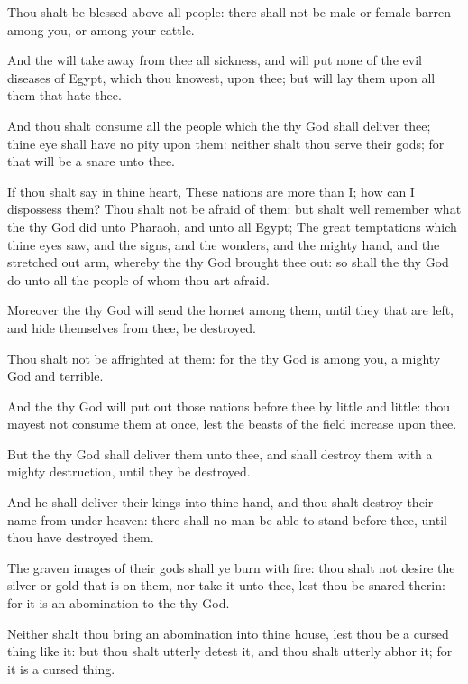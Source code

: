 \Verse Thou shalt be blessed above all people: there shall not be male or female barren among you, or among your cattle.

\Verse And the \LORD will take away from thee all sickness, and will put none of the evil diseases of Egypt, which thou knowest, upon thee; but will lay them upon all them that hate thee.

\Verse And thou shalt consume all the people which the \LORD thy God shall deliver thee; thine eye shall have no pity upon them: neither shalt thou serve their gods; for that will be a snare unto thee.

\Verse If thou shalt say in thine heart, These nations are more than I; how can I dispossess them?  \Verse Thou shalt not be afraid of them: but shalt well remember what the \LORD thy God did unto Pharaoh, and unto all Egypt; \Verse The great temptations which thine eyes saw, and the signs, and the wonders, and the mighty hand, and the stretched out arm, whereby the \LORD thy God brought thee out: so shall the \LORD thy God do unto all the people of whom thou art afraid.

\Verse Moreover the \LORD thy God will send the hornet among them, until they that are left, and hide themselves from thee, be destroyed.

\Verse Thou shalt not be affrighted at them: for the \LORD thy God is among you, a mighty God and terrible.

\Verse And the \LORD thy God will put out those nations before thee by little and little: thou mayest not consume them at once, lest the beasts of the field increase upon thee.

\Verse But the \LORD thy God shall deliver them unto thee, and shall destroy them with a mighty destruction, until they be destroyed.

\Verse And he shall deliver their kings into thine hand, and thou shalt destroy their name from under heaven: there shall no man be able to stand before thee, until thou have destroyed them.

\Verse The graven images of their gods shall ye burn with fire: thou shalt not desire the silver or gold that is on them, nor take it unto thee, lest thou be snared therin: for it is an abomination to the \LORD thy God.

\Verse Neither shalt thou bring an abomination into thine house, lest thou be a cursed thing like it: but thou shalt utterly detest it, and thou shalt utterly abhor it; for it is a cursed thing.


